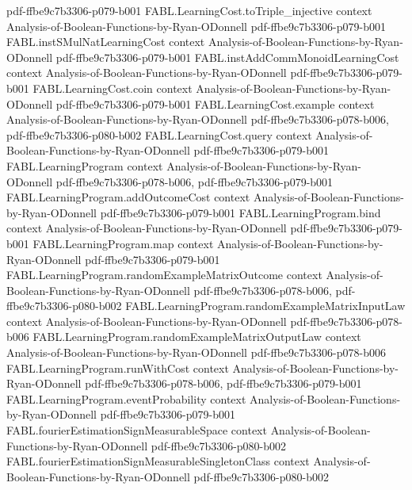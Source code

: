 \begin{theorem}
  {pdf-ffbe9c7b3306-p079-b001}
\proofstep
  {FABL.LearningCost.toTriple_injective}
  {context}
  {Analysis-of-Boolean-Functions-by-Ryan-ODonnell}
  {pdf-ffbe9c7b3306-p079-b001}
\proofstep
  {FABL.instSMulNatLearningCost}
  {context}
  {Analysis-of-Boolean-Functions-by-Ryan-ODonnell}
  {pdf-ffbe9c7b3306-p079-b001}
\proofstep
  {FABL.instAddCommMonoidLearningCost}
  {context}
  {Analysis-of-Boolean-Functions-by-Ryan-ODonnell}
  {pdf-ffbe9c7b3306-p079-b001}
\proofstep
  {FABL.LearningCost.coin}
  {context}
  {Analysis-of-Boolean-Functions-by-Ryan-ODonnell}
  {pdf-ffbe9c7b3306-p079-b001}
\proofstep
  {FABL.LearningCost.example}
  {context}
  {Analysis-of-Boolean-Functions-by-Ryan-ODonnell}
  {pdf-ffbe9c7b3306-p078-b006,
    pdf-ffbe9c7b3306-p080-b002}
\proofstep
  {FABL.LearningCost.query}
  {context}
  {Analysis-of-Boolean-Functions-by-Ryan-ODonnell}
  {pdf-ffbe9c7b3306-p079-b001}
\proofstep
  {FABL.LearningProgram}
  {context}
  {Analysis-of-Boolean-Functions-by-Ryan-ODonnell}
  {pdf-ffbe9c7b3306-p078-b006,
    pdf-ffbe9c7b3306-p079-b001}
\proofstep
  {FABL.LearningProgram.addOutcomeCost}
  {context}
  {Analysis-of-Boolean-Functions-by-Ryan-ODonnell}
  {pdf-ffbe9c7b3306-p079-b001}
\proofstep
  {FABL.LearningProgram.bind}
  {context}
  {Analysis-of-Boolean-Functions-by-Ryan-ODonnell}
  {pdf-ffbe9c7b3306-p079-b001}
\proofstep
  {FABL.LearningProgram.map}
  {context}
  {Analysis-of-Boolean-Functions-by-Ryan-ODonnell}
  {pdf-ffbe9c7b3306-p079-b001}
\proofstep
  {FABL.LearningProgram.randomExampleMatrixOutcome}
  {context}
  {Analysis-of-Boolean-Functions-by-Ryan-ODonnell}
  {pdf-ffbe9c7b3306-p078-b006,
    pdf-ffbe9c7b3306-p080-b002}
\proofstep
  {FABL.LearningProgram.randomExampleMatrixInputLaw}
  {context}
  {Analysis-of-Boolean-Functions-by-Ryan-ODonnell}
  {pdf-ffbe9c7b3306-p078-b006}
\proofstep
  {FABL.LearningProgram.randomExampleMatrixOutputLaw}
  {context}
  {Analysis-of-Boolean-Functions-by-Ryan-ODonnell}
  {pdf-ffbe9c7b3306-p078-b006}
\proofstep
  {FABL.LearningProgram.runWithCost}
  {context}
  {Analysis-of-Boolean-Functions-by-Ryan-ODonnell}
  {pdf-ffbe9c7b3306-p078-b006,
    pdf-ffbe9c7b3306-p079-b001}
\proofstep
  {FABL.LearningProgram.eventProbability}
  {context}
  {Analysis-of-Boolean-Functions-by-Ryan-ODonnell}
  {pdf-ffbe9c7b3306-p079-b001}
\proofstep
  {FABL.fourierEstimationSignMeasurableSpace}
  {context}
  {Analysis-of-Boolean-Functions-by-Ryan-ODonnell}
  {pdf-ffbe9c7b3306-p080-b002}
\proofstep
  {FABL.fourierEstimationSignMeasurableSingletonClass}
  {context}
  {Analysis-of-Boolean-Functions-by-Ryan-ODonnell}
  {pdf-ffbe9c7b3306-p080-b002}

\end{theorem}
